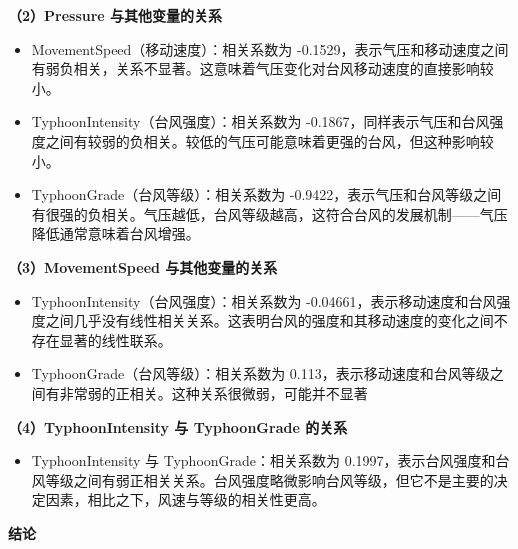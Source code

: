 \documentclass[withoutpreface,bwprint]{cumcmthesis}
\begin{document}
\textbf{（2）Pressure 与其他变量的关系}

\begin{itemize}
    \setlength{\itemindent}{2em}
    \item MovementSpeed（移动速度）：相关系数为 -0.1529，表示气压和移动速度之间有弱负相关，关系不显著。这意味着气压变化对台风移动速度的直接影响较小。

    \item TyphoonIntensity（台风强度）：相关系数为 -0.1867，同样表示气压和台风强度之间有较弱的负相关。较低的气压可能意味着更强的台风，但这种影响较小。

    \item TyphoonGrade（台风等级）：相关系数为 -0.9422，表示气压和台风等级之间有很强的负相关。气压越低，台风等级越高，这符合台风的发展机制——气压降低通常意味着台风增强。

\end{itemize}

\textbf{（3）MovementSpeed 与其他变量的关系}

\begin{itemize}
    \setlength{\itemindent}{2em}
    \item TyphoonIntensity（台风强度）：相关系数为 -0.04661，表示移动速度和台风强度之间几乎没有线性相关关系。这表明台风的强度和其移动速度的变化之间不存在显著的线性联系。

    \item TyphoonGrade（台风等级）：相关系数为 0.113，表示移动速度和台风等级之间有非常弱的正相关。这种关系很微弱，可能并不显著

\end{itemize}

\textbf{（4）TyphoonIntensity 与 TyphoonGrade 的关系}

\begin{itemize}
    \setlength{\itemindent}{2em}
    \item TyphoonIntensity 与 TyphoonGrade：相关系数为 0.1997，表示台风强度和台风等级之间有弱正相关关系。台风强度略微影响台风等级，但它不是主要的决定因素，相比之下，风速与等级的相关性更高。

\end{itemize}

\vspace{1em}
\textbf{结论}
\end{document}
